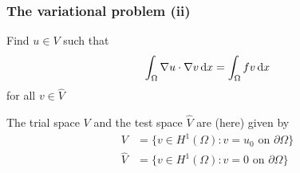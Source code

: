 \begin{frame}
  \frametitle{The variational problem (ii)}

  Find $u \in V$ such that
  \begin{equation*}
    \int_{\Omega} \nabla u \cdot \nabla v \, \mathrm{d}x =
    \int_{\Omega} fv \, \mathrm{d}x
  \end{equation*}
  for all $v \in \hat{V}$

  \bigskip

  The trial space $V$ and the test space $\hat{V}$ are (here)
  given by
  \begin{equation*}
    \begin{split}
      V       &= \{v \in H^1(\Omega) : v = u_0 \mbox{ on } \partial\Omega\} \\
      \hat{V} &= \{v \in H^1(\Omega) : v = 0 \mbox{ on } \partial\Omega\}
    \end{split}
  \end{equation*}

\end{frame}
